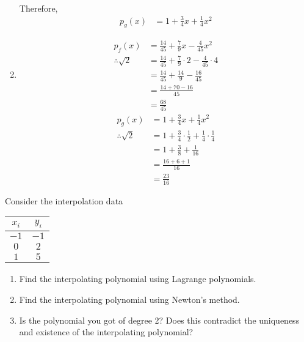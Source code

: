 \documentclass[fleqn, a4paper, 11pt, oneside]{amsart}
\theoremstyle{definition}
\theoremstyle{theorem}
\begin{document}
\begin{solution}
\begin{enumerate}[leftmargin=*]
\begin{align*}
			\end{align*}
			Therefore,
			\begin{align*}
				p_g(x) &= 1 + \frac{3}{4} x + \frac{1}{4} x^2
			\end{align*}
		\item
			\begin{align*}
				p_f(x) &= \frac{14}{45} + \frac{7}{9} x - \frac{4}{45} x^2\\
				\therefore \sqrt{2} &= \frac{14}{45} + \frac{7}{9} \cdot 2 - \frac{4}{45} \cdot 4\\
				&= \frac{14}{45} + \frac{14}{9} - \frac{16}{45}\\
				&= \frac{14 + 70 - 16}{45}\\
				&= \frac{68}{45}
			\end{align*}
			\begin{align*}
				p_g(x) &= 1 + \frac{3}{4} x + \frac{1}{4} x^2\\
				\therefore \sqrt{2} &= 1 + \frac{3}{4} \cdot \frac{1}{2} + \frac{1}{4} \cdot \frac{1}{4}\\
				&= 1 + \frac{3}{8} + \frac{1}{16}\\
				&= \frac{16 + 6 + 1}{16}\\
				&= \frac{23}{16}
			\end{align*}
	\end{enumerate}
\end{solution}

\begin{question}
	Consider the interpolation data
	\begin{table}[H]
		\centering
		\begin{tabular}{|c|c|}
			\hline
			$x_i$ & $y_i$\\
			\hline
			$-1$ & $-1$\\
			$0$ & $2$\\
			$1$ & $5$\\
			\hline
		\end{tabular}
	\end{table}
	\begin{enumerate}
		\item
			Find the interpolating polynomial using Lagrange polynomials.
		\item
			Find the interpolating polynomial using Newton's method.
		\item
			Is the polynomial you got of degree 2?
			Does this contradict the uniqueness and existence of the interpolating polynomial?
	\end{enumerate}
\end{question}
\end{document}
